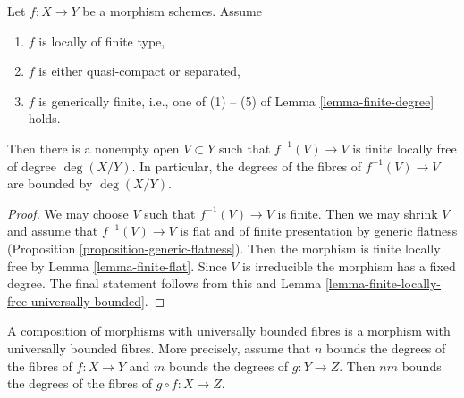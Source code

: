 \begin{lemma}
\label{lemma-bound-degree-in-nbhd-generic-point}
Let $f : X \to Y$ be a morphism schemes. Assume
\begin{enumerate}
\item $f$ is locally of finite type,
\item $f$ is either quasi-compact or separated,
\item $f$ is generically finite, i.e., one of (1) -- (5) of
Lemma \ref{lemma-finite-degree} holds.
\end{enumerate}
Then there is a nonempty open $V \subset Y$ such that
$f^{-1}(V) \to V$ is finite locally free of degree $\deg(X/Y)$.
In particular, the degrees of the fibres of $f^{-1}(V) \to V$
are bounded by $\deg(X/Y)$.
\end{lemma}

\begin{proof}
We may choose $V$ such that $f^{-1}(V) \to V$ is finite.
Then we may shrink $V$ and assume that $f^{-1}(V) \to V$
is flat and of finite presentation by generic flatness
(Proposition \ref{proposition-generic-flatness}).
Then the morphism is finite locally free by
Lemma \ref{lemma-finite-flat}.
Since $V$ is irreducible the morphism has a fixed degree.
The final statement follows from this and
Lemma \ref{lemma-finite-locally-free-universally-bounded}.
\end{proof}

\begin{lemma}
\label{lemma-composition-universally-bounded}
A composition of morphisms with universally bounded fibres
is a morphism with universally bounded fibres. More precisely,
assume that $n$ bounds the degrees of the fibres of $f : X \to Y$ and
$m$ bounds the degrees of $g : Y \to Z$.
Then $nm$ bounds the degrees of the fibres of $g \circ f : X \to Z$.
\end{lemma}

